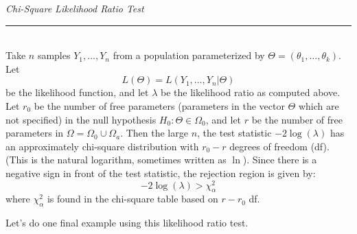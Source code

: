 \documentclass[12pt]{article}
\theoremstyle{definition}
\theoremstyle{remark}
\begin{document}
\begin{framed}
\emph{Chi-Square Likelihood Ratio Test}\\
  \rule{\dimexpr{}\fboxrule}{.1pt} \\
Take $n$ samples $Y_1, \dots, Y_n$ from a population parameterized by $\Theta = (\theta_1, \dots, \theta_k)$. Let 
\[
L(\Theta) = L(Y_1, \dots, Y_n|\Theta)
\]
be the likelihood function, and let $\lambda$ be the likelihood ratio as computed above. Let $r_0$ be the number of free parameters (parameters in the vector $\Theta$ which are not specified) in the null hypothesis $H_0: \Theta \in \Omega_0$, and let $r$ be the number of free parameters in $\Omega = \Omega_0 \cup \Omega_a$. Then the large $n$, the test statistic $-2 \log(\lambda)$ has an approximately chi-square distribution with $r_0 - r$ degrees of freedom (df). (This is the natural logarithm, sometimes written as $\ln$). Since there is a negative sign in front of the test statistic, the rejection region is given by:
\[
-2 \log(\lambda) > \chi_\alpha^2
\]
where $\chi_\alpha^2$ is found in the chi-square table based on $r - r_0$ df.
\end{framed}

Let's do one final example using this likelihood ratio test. 
\end{document}
